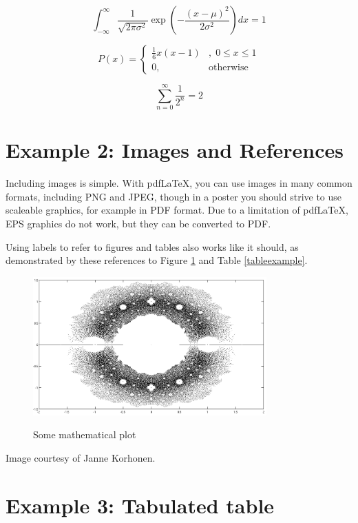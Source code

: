 \documentclass[final]{beamer}
\begin{document}
\begin{poster}
\begin{equation}
	\int_{-\infty}^{\infty} \frac{1}{\sqrt{2 \pi \sigma^2}} \exp\left(-\frac{(x - \mu)^2}{2 \sigma^2} \right) dx = 1
\end{equation}

\begin{equation}
	P(x) = \left\{ \begin{array}{lr} \frac{1}{6}x(x-1)&,\; 0 \leq x \leq 1 \\ 0, & \text{otherwise}  \end{array} \right.
\end{equation}

\begin{equation}
	\sum_{n=0}^\infty \frac{1}{2^n} = 2
\end{equation}



\section{Example 2: Images and References}
Including images is simple.  With pdf\LaTeX, you can use images in many common formats, including PNG and JPEG, though in a poster you should strive to use scaleable graphics, for example in PDF format. Due to a limitation of pdf\LaTeX, EPS graphics do not work, but they can be converted to PDF.
	
Using labels to refer to figures and tables also works like it should, as demonstrated by these references to Figure \ref{examplefigure} and Table \ref{tableexample}.

\begin{figure}
\includegraphics[width=0.8\textwidth]{zeros.png}
\label{examplefigure}
\caption{Some mathematical plot}
\end{figure}

Image courtesy of Janne Korhonen.


\section{Example 3: Tabulated table}


\end{poster}
\end{document}
